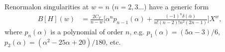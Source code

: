 Renormalon singularities at $w=n$ ($n=2,3...$) have a generic form
\begin{align}
B[H](w)&=\frac{2C_F}{n-w}\Big[\alpha^np_{n-1}(\alpha)+\frac{(-1)^n\delta(\bar \alpha)}{n!(n\!-\!2)!n^2(2n\!-\!1)}\Big] X^w,
\end{align}
where $p_n(\alpha)$ is a polynomial of order $n$, e.g. $p_1(\alpha)=(5\alpha-3)/6$, $p_2(\alpha)=(\alpha^2-25\alpha+20)/180$, etc.


%
